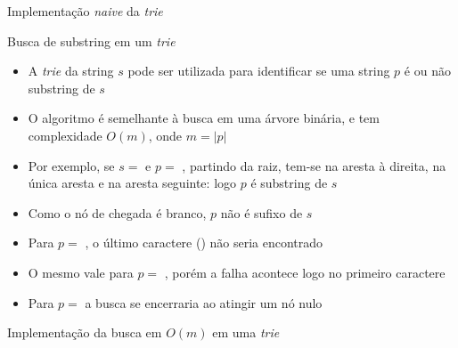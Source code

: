 \begin{frame}[fragile]{Implementação {\it naive} da {\it trie}}
\end{frame}

\begin{frame}[fragile]{Busca de substring em um {\it trie}}

    \begin{itemize}
        \item A \textit{trie} da string $s$ pode ser utilizada para identificar se uma string 
            $p$ é ou não substring de $s$
        \pause

        \item O algoritmo é semelhante à busca em uma árvore binária, e tem complexidade $O(m)$, onde $m = |p|$
        \pause

        \item Por exemplo, se $s = $  e $p = $ , partindo da 
            raiz, tem-se  na aresta à direita,  na única 
            aresta e  na aresta seguinte: logo $p$ é substring de $s$
        \pause

        \item Como o nó de chegada é branco, $p$ não é sufixo de $s$
        \pause

        \item Para $p =$ , o último caractere () não seria 
            encontrado
        \pause

        \item O mesmo vale para $p = $ , porém a falha acontece logo no primeiro 
            caractere
        \pause

        \item Para $p = $  a busca se encerraria ao atingir um nó nulo

    \end{itemize}

\end{frame}

\begin{frame}[fragile]{Implementação da busca em $O(m)$ em uma {\it trie}}
\end{frame}

